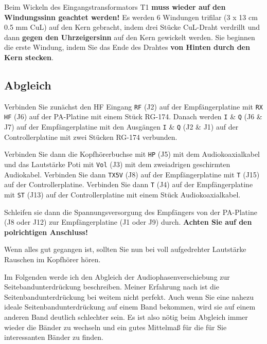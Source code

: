 \documentclass[10pt, a4paper]{paper}
\newcommand{\warn}[1]{\textbf{#1}}
\newcommand{\con}[1]{\texttt{#1}}
\begin{document}
Beim Wickeln des Eingangstransformators T1 \warn{muss wieder auf den Windungssinn geachtet werden!} Es werden 6 Windungen trifilar (3 x 13 cm 0.5 mm CuL) auf den Kern gebracht, indem drei Stücke CuL-Draht verdrillt und dann \textbf{gegen den Uhrzeigersinn} auf den Kern gewickelt werden. Sie beginnen die erste Windung, indem Sie das Ende des Drahtes \textbf{von Hinten durch den Kern stecken}.

\subsection{Abgleich}
Verbinden Sie zunächst den HF Eingang \con{RF} (J2) auf der Emp\-fän\-ger\-pla\-ti\-ne mit \con{RX HF} (J6) auf der PA-Platine mit einem Stück RG-174. Danach werden \con{I} \& \con{Q} (J6 \& J7) auf der Empfängerplatine mit den Ausgängen \con{I} \& \con{Q} (J2 \& J1) auf der Controllerplatine mit zwei Stücken RG-174 verbunden. 

Verbinden Sie dann die Kopf\-hö\-rer\-buch\-se mit \con{HP} (J5) mit dem Audiokoaxialkabel und das Lautstärke Poti mit \con{Vol} (J3) mit dem zweiadrigen geschirmten Audiokabel. Verbinden Sie dann \con{TX5V} (J8) auf der Empfängerplatine mit \con{T} (J15) auf der Controllerplatine. Verbinden Sie dann \con{T} (J4) auf der Empfängerplatine mit \con{ST} (J13) auf der Controllerplatine mit einem Stück Audiokoaxialkabel. 

Schleifen sie dann die Spannungsversorgung des Empfängers von der PA-Platine (J8 oder J12) zur Empfängerplatine (J1 oder J9) durch. \warn{Achten Sie auf den polrichtigen Anschluss!}

Wenn alles gut gegangen ist, sollten Sie nun bei voll aufgedrehter Lautstärke Rauschen im Kopfhörer hören. 

Im Folgenden werde ich den Abgleich der Audiophasenverschiebung zur Seitebandunterdrückung beschreiben. Meiner Erfahrung nach ist die Seitenbandunterdrückung bei weitem nicht perfekt. Auch wenn Sie eine nahezu ideale Seitenbandunterdrückung auf einem Band bekommen, wird sie auf einem anderen Band deutlich schlechter sein. Es ist also nötig beim Abgleich immer wieder die Bänder zu wechseln und ein gutes Mittelmaß für die für Sie interessanten Bänder zu finden. 
\end{document}
